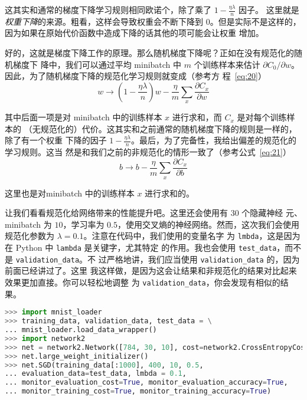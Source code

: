 这其实和通常的梯度下降学习规则相同欧诺个，除了乘了 $1-\frac{\eta\lambda}{n}$ 因子。
这里就是\emph{权重下降}的来源。粗看，这样会导致权重会不断下降到
$0$。但是实际不是这样的，因为如果在原始代价函数中造成下降的话其他的项可能会让权重
增加。

好的，这就是梯度下降工作的原理。那么随机梯度下降呢？正如在没有规范化的随机梯度下
降中，我们可以通过平均 minibatch 中 $m$ 个训练样本来估计
$\partial C_0/\partial w$。因此，为了随机梯度下降的规范化学习规则就变成（参考方
程~\eqref{eq:20}）
\begin{equation}
  w \rightarrow \left(1-\frac{\eta \lambda}{n}\right) w -\frac{\eta}{m}
  \sum_x \frac{\partial C_x}{\partial w}
  \label{eq:93}\tag{93}
\end{equation}

其中后面一项是对 minibatch 中的训练样本 $x$ 进行求和，而 $C_x$ 是对每个训练样本的
（无规范化的）代价。这其实和之前通常的随机梯度下降的规则是一样的，除了有一个权重
下降的因子
$1-\frac{\eta \lambda}{n}$。最后，为了完备性，我给出偏差的规范化的学习规则。这当
然是和我们之前的非规范化的情形一致了（参考公式~\eqref{eq:21}）
\begin{equation}
  b \rightarrow b - \frac{\eta}{m} \sum_x \frac{\partial C_x}{\partial b}
  \label{eq:94}\tag{94}
\end{equation}

这里也是对minibatch 中的训练样本 $x$ 进行求和的。

让我们看看规范化给网络带来的性能提升吧。这里还会使用有 $30$ 个隐藏神经
元、minibatch 为 $10$，学习率为 $0.5$，使用交叉熵的神经网络。然而，这次我们会使用
规范化参数为 $\lambda = 0.1$。注意在代码中，我们使用的变量名字
为 \lstinline!lmbda!，这是因为在 Python 中 \lstinline!lambda! 是关键字，尤其特定
的作用。我也会使用 \lstinline!test_data!，而不是 \lstinline!validation_data!。不
过严格地讲，我们应当使用 \lstinline!validation_data! 的，因为前面已经讲过了。这里
我这样做，是因为这会让结果和非规范化的结果对比起来效果更加直接。你可以轻松地调整
为 \lstinline!validation_data!，你会发现有相似的结果。

\begin{lstlisting}[language=Python]
>>> import mnist_loader
>>> training_data, validation_data, test_data = \
... mnist_loader.load_data_wrapper()
>>> import network2
>>> net = network2.Network([784, 30, 10], cost=network2.CrossEntropyCost)
>>> net.large_weight_initializer()
>>> net.SGD(training_data[:1000], 400, 10, 0.5,
... evaluation_data=test_data, lmbda = 0.1,
... monitor_evaluation_cost=True, monitor_evaluation_accuracy=True,
... monitor_training_cost=True, monitor_training_accuracy=True)
\end{lstlisting}

